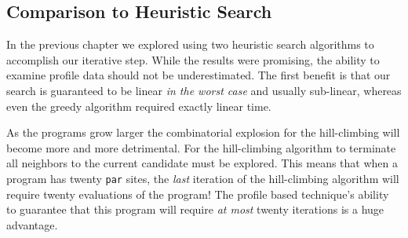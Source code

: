 \subsection{Comparison to Heuristic Search}

In the previous chapter we explored using two heuristic search algorithms to
accomplish our iterative step. While the results were promising, the ability to
examine profile data should not be underestimated. The first benefit is that
our search is guaranteed to be linear \emph{in the worst case} and usually
sub-linear, whereas even the greedy algorithm required exactly linear time.

As the programs grow larger the combinatorial explosion for the hill-climbing
will become more and more detrimental. For the hill-climbing algorithm to
terminate all neighbors to the current candidate must be explored. This means
that when a program has twenty \verb|par| sites, the \emph{last} iteration of
the hill-climbing algorithm will require twenty evaluations of the program! The
profile based technique's ability to guarantee that this program will require
\emph{at most} twenty iterations is a huge advantage.
